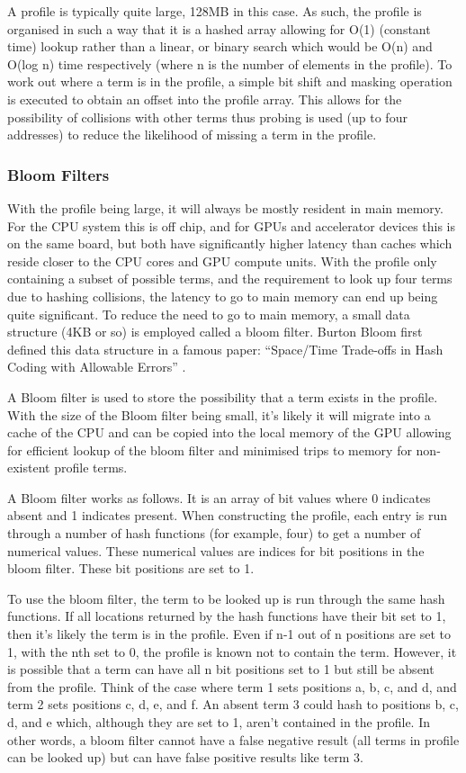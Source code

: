 A profile is typically quite large, 128MB in this case. As such, the profile is
organised in such a way that it is a hashed array allowing for O(1) (constant
time) lookup rather than a linear, or binary search which would be O(n) and
O(log n) time respectively (where n is the number of elements in the profile).
To work out where a term is in the profile, a simple bit shift and masking
operation is executed to obtain an offset into the profile array. This allows
for the possibility of collisions with other terms thus probing is used (up to
four addresses) to reduce the likelihood of missing a term in the profile.

\subsubsection{Bloom Filters}

With the profile being large, it will always be mostly resident in main memory.
For the CPU system this is off chip, and for GPUs and accelerator devices this
is on the same board, but both have significantly higher latency than caches
which reside closer to the CPU cores and GPU compute units. With the profile
only containing a subset of possible terms, and the requirement to look up four
terms due to hashing collisions, the latency to go to main memory can end up
being quite significant. To reduce the need to go to main memory, a small data
structure (4KB or so) is employed called a bloom filter. Burton Bloom first
defined this data structure in a famous paper: ``Space/Time Trade-offs in Hash
Coding with Allowable Errors'' \cite{bloom1970space}.

A Bloom filter is used to store the possibility that a term exists in the
profile. With the size of the Bloom filter being small, it's likely it will
migrate into a cache of the CPU and can be copied into the local memory of the
GPU allowing for efficient lookup of the bloom filter and minimised trips to
memory for non-existent profile terms.

A Bloom filter works as follows. It is an array of bit values where 0 indicates
absent and 1 indicates present. When constructing the profile, each entry is
run through a number of hash functions (for example, four) to get a number of
numerical values. These numerical values are indices for bit positions in the
bloom filter. These bit positions are set to 1.

To use the bloom filter, the term to be looked up is run through the same hash
functions. If all locations returned by the hash functions have their bit set to
1, then it's likely the term is in the profile. Even if n-1 out of n positions
are set to 1, with the nth set to 0, the profile is known not to contain the
term. However, it is possible that a term can have all n bit positions set to 1
but still be absent from the profile. Think of the case where term 1 sets
positions a, b, c, and d, and term 2 sets positions c, d, e, and f. An absent
term 3 could hash to positions b, c, d, and e which, although they are set to 1,
aren't contained in the profile. In other words, a bloom filter cannot have a
false negative result (all terms in profile can be looked up) but can have false
positive results like term 3.

